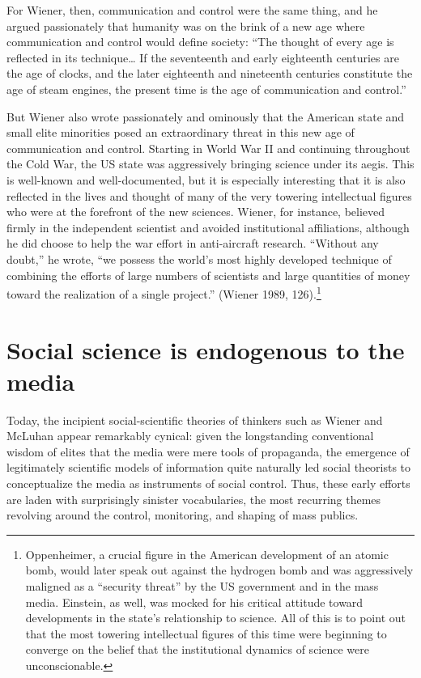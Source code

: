 \documentclass[12pt,book]{article}
\begin{document}
For Wiener, then, communication and control were the same thing, and he
argued passionately that humanity was on the brink of a new age where
communication and control would define society: ``The thought of every
age is reflected in its technique\ldots{} If the seventeenth and early
eighteenth centuries are the age of clocks, and the later eighteenth and
nineteenth centuries constitute the age of steam engines, the present
time is the age of communication and control.''

But Wiener also wrote passionately and ominously that the American state
and small elite minorities posed an extraordinary threat in this new age
of communication and control. Starting in World War II and continuing
throughout the Cold War, the US state was aggressively bringing science
under its aegis. This is well-known and well-documented, but it is
especially interesting that it is also reflected in the lives and
thought of many of the very towering intellectual figures who were at
the forefront of the new sciences. Wiener, for instance, believed firmly
in the independent scientist and avoided institutional affiliations,
although he did choose to help the war effort in anti-aircraft research.
``Without any doubt,'' he wrote, ``we possess the world's most highly
developed technique of combining the efforts of large numbers of
scientists and large quantities of money toward the realization of a
single project.'' (Wiener 1989, 126).\footnote{Oppenheimer, a crucial
  figure in the American development of an atomic bomb, would later
  speak out against the hydrogen bomb and was aggressively maligned as a
  ``security threat'' by the US government and in the mass media.
  Einstein, as well, was mocked for his critical attitude toward
  developments in the state's relationship to science. All of this is to
  point out that the most towering intellectual figures of this time
  were beginning to converge on the belief that the institutional
  dynamics of science were unconscionable.}

\section{Social science is endogenous to the
media}\label{social-science-is-endogenous-to-the-media}

Today, the incipient social-scientific theories of thinkers such as
Wiener and McLuhan appear remarkably cynical: given the longstanding
conventional wisdom of elites that the media were mere tools of
propaganda, the emergence of legitimately scientific models of
information quite naturally led social theorists to conceptualize the
media as instruments of social control. Thus, these early efforts are
laden with surprisingly sinister vocabularies, the most recurring themes
revolving around the control, monitoring, and shaping of mass publics.
\end{document}
